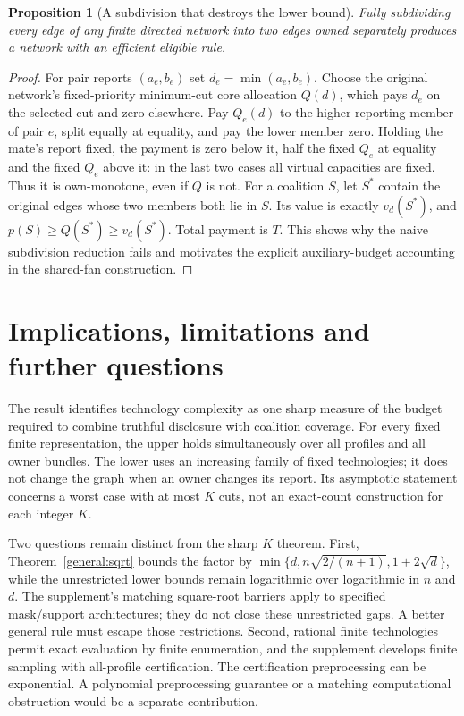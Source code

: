 \documentclass[11pt]{article}
\newtheorem{proposition}[theorem]{Proposition}
\theoremstyle{definition}\newtheorem{definition}[theorem]{Definition}
\theoremstyle{remark}\newtheorem{remark}[theorem]{Remark}
\begin{document}
\begin{proposition}[A subdivision that destroys the lower bound]\label{dag:subdivision}
Fully subdividing every edge of any finite directed network into two edges
owned separately produces a network with an efficient eligible rule.
\end{proposition}
\begin{proof}
For pair reports $(a_e,b_e)$ set $d_e=\min(a_e,b_e)$. Choose the original
network's fixed-priority minimum-cut core allocation $Q(d)$, which pays
$d_e$ on the selected cut and zero elsewhere. Pay $Q_e(d)$ to the higher
reporting member of pair $e$, split equally at equality, and pay the lower
member zero. Holding the mate's report fixed, the payment is zero below it,
half the fixed $Q_e$ at equality and the fixed $Q_e$ above it: in the last
two cases all virtual capacities are fixed. Thus it is own-monotone, even
if $Q$ is not. For a coalition $S$, let $S^*$ contain the original edges
whose two members both lie in $S$. Its value is exactly $v_d(S^*)$, and
$p(S)\ge Q(S^*)\ge v_d(S^*)$. Total payment is $T$. This shows why the naive subdivision reduction fails and motivates the
explicit auxiliary-budget accounting in the shared-fan construction.
\end{proof}


\section{Implications, limitations and further questions}
The result identifies technology complexity as one sharp measure of the
budget required to combine truthful disclosure with coalition coverage.
For every fixed finite representation, the upper holds simultaneously over
all profiles and all owner bundles. The lower uses an increasing family of
fixed technologies; it does not change the graph when an owner changes its
report. Its asymptotic statement concerns a worst case with at most $K$ cuts,
not an exact-count construction for each integer $K$.

Two questions remain distinct from the sharp $K$ theorem. First,
Theorem~\ref{general:sqrt} bounds the factor by
$\min\{d,n\sqrt{2/(n+1)},1+2\sqrt d\}$, while the unrestricted lower bounds
remain logarithmic over logarithmic in $n$ and $d$. The supplement's matching
square-root barriers apply to specified mask/support architectures; they do
not close these unrestricted gaps. A better general rule must escape those
restrictions. Second, rational finite technologies permit exact evaluation
by finite enumeration, and the supplement develops finite sampling with
all-profile certification. The certification preprocessing can be exponential.
A polynomial preprocessing guarantee or a matching computational obstruction
would be a separate contribution.
\end{document}
